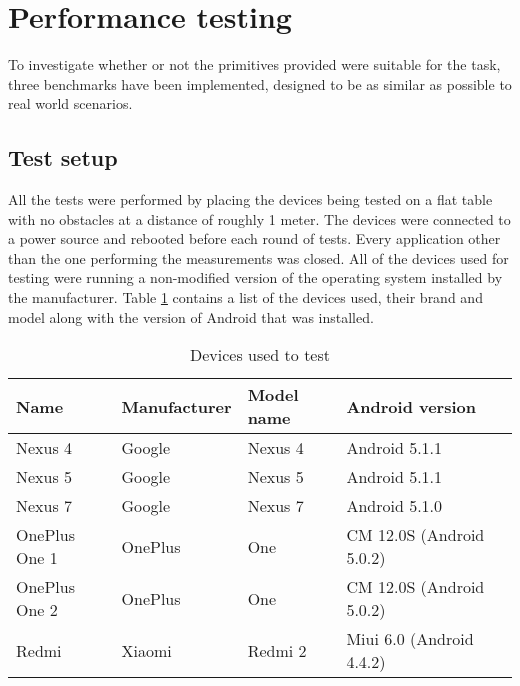 \section{Performance testing}
To investigate whether or not the primitives provided were suitable for the task, three benchmarks have been implemented, designed to be as similar as possible to real world scenarios.

\subsection{Test setup}
All the tests were performed by placing the devices being tested on a flat table with no obstacles at a distance of roughly 1 meter.
The devices were connected to a power source and rebooted before each round of tests.
Every application other than the one performing the measurements was closed.
All of the devices used for testing were running a non-modified version of the operating system installed by the manufacturer.
Table \ref{table:devices-used} contains a list of the devices used, their brand and model along with the version of Android that was installed.


\begin{table}[h]
\centering
\caption{Devices used to test}
\label{table:devices-used}
\begin{tabular}{lllll}
\hline
Name          & Manufacturer      & Model name      & Android version           \\ \hline
Nexus 4       & Google            & Nexus 4         & Android 5.1.1             \\
Nexus 5       & Google            & Nexus 5         & Android 5.1.1             \\
Nexus 7       & Google            & Nexus 7         & Android 5.1.0             \\
OnePlus One 1 & OnePlus           & One             & CM 12.0S (Android 5.0.2)  \\
OnePlus One 2 & OnePlus           & One             & CM 12.0S (Android 5.0.2)  \\
Redmi         & Xiaomi            & Redmi 2         & Miui 6.0 (Android 4.4.2)  \\ 
\hline
\end{tabular}
\end{table}





